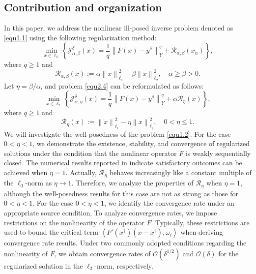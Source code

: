 \documentclass[a4paper,12pt]{article}
\numberwithin{equation}{section}
\begin{document}
\subsection{Contribution and organization}\label{sec1.2}

\par In this paper, we address the nonlinear ill-posed inverse problem denoted as \eqref{equ1.1} using the following regularization method:
\begin{equation}\label{equ2.4}
    \min_{x\in\ell_{2}}\left\{\mathcal{J}_{\alpha,\beta}^{\delta}\left(x\right)= \frac{1}{q} \left\|F\left(x\right)-y^{\delta}\right\|_{Y}^{q}+ \mathcal{R}_{\alpha,\beta}(x_{n})\right\},
\end{equation}
where $q\geq 1$ and
\begin{equation*}
    \mathcal{R}_{\alpha,\beta}(x):=\alpha\left\|x\right\|_{\ell_{1}}^{2}- \beta\left\|x\right\|_{\ell_{2}}^{2},\quad \alpha \geq\beta >0.
\end{equation*}
Let $\eta=\beta/\alpha$, and problem \eqref{equ2.4} can be reformulated as follows:
\begin{equation}\label{equ1.2}
    \min_{x\in\ell_{2}}\left\{\mathcal{J}_{\alpha,\eta}^{\delta}\left(x\right)= \frac{1}{q}\left\|F\left(x\right)-y^{\delta}\right\|_{Y}^{q}+ \alpha\mathcal{R}_{\eta}\left(x\right)\right\},
\end{equation}
where $q\geq 1$ and 
\begin{equation}\label{equ1.3}
    \mathcal{R}_{\eta}\left(x\right):=\left\|x\right\|_{\ell_{1}}^{2} -\eta\left\|x\right\|_{\ell_{2}}^{2},\quad 0<\eta\leq 1.
\end{equation}
We will investigate the well-posedness of the problem \eqref{equ1.2}. For the case $0<\eta <1$, we demonstrate the existence, stability, and convergence of regularized solutions under the condition that the nonlinear operator $F$ is weakly sequentially closed. The numerical results reported in \cite{LD25} indicate satisfactory outcomes can be achieved when $\eta=1$. Actually, $\mathcal{R}_{\eta}$  behaves increasingly like a constant multiple of the $\ell_{0}$-norm as $\eta\rightarrow 1$. Therefore, we analyze the properties of $\mathcal{R}_{\eta}$ when $\eta=1$, although the well-posedness results for this case are not as strong as those for $0<\eta <1$. For the case $0<\eta <1$, we identify the convergence rate under an appropriate source condition. To analyze convergence rates, we impose restrictions on the nonlinearity of the operator $F$. Typically, these restrictions are used to bound the critical term $\left<F'\left(x^{\dagger}\right)\left(x-x^{\dagger}\right),\omega_{i}\right>$ when deriving convergence rate results. Under two commonly adopted conditions regarding the nonlinearity of $F$,  we obtain convergence rates of $\mathcal{O}\left(\delta^{1/2}\right)$ and $\mathcal{O}\left(\delta\right)$ for the regularized solution in the $\ell_{2}$-norm, respectively.
\end{document}
